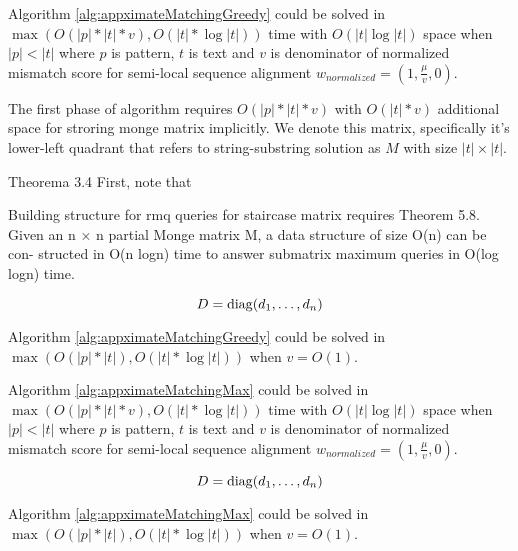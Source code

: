 \begin{theorem}
Algorithm \ref{alg:appximateMatchingGreedy} could  be solved in 
$\max ( O(|p| * |t| * v), O(|t| * \log |t|))$ time with $ O(|t| \log |t|)$ space when $|p|<|t|$ where $p$ is pattern, $t$ is text and $v$ is denominator of normalized mismatch score for semi-local sequence alignment
$w_{normalized} = (1,\frac{\mu}{v},0)$.

The first phase of algorithm requires $O(|p| * |t| * v)$ with $O(|t| * v)$ additional space for stroring monge matrix implicitly.
We denote this matrix, specifically it's lower-left quadrant that refers to
string-substring solution as $M$ with size $|t| \times |t|$.


  Theorema 3.4
First, note that 

Building structure for rmq queries for staircase matrix requires 
Theorem 5.8. Given an n × n partial Monge matrix M, a data structure of size O(n) can be con-
structed in O(n logn) time to answer submatrix maximum queries in O(log logn) time.
   

\begin{displaymath}
    D = \operatorname{diag}(d_1,\dots,d_n)
  \end{displaymath}
\end{theorem}


\begin{corollary}
Algorithm \ref{alg:appximateMatchingGreedy} could  be solved in 
$\max ( O(|p| * |t|), O(|t| * \log |t|))$ when $v = O(1)$.

\end{corollary}


\begin{theorem}
Algorithm \ref{alg:appximateMatchingMax} could  be solved in 
$\max ( O(|p| * |t| * v), O(|t| * \log |t|))$ time with $ O(|t| \log |t|)$ space when $|p|<|t|$ where $p$ is pattern, $t$ is text and $v$ is denominator of normalized mismatch score for semi-local sequence alignment
$w_{normalized} = (1,\frac{\mu}{v},0)$.

\begin{displaymath}
    D = \operatorname{diag}(d_1,\dots,d_n)
  \end{displaymath}
\end{theorem}


\begin{corollary}
Algorithm \ref{alg:appximateMatchingMax} could  be solved in 
$\max ( O(|p| * |t|), O(|t| * \log |t|))$ when $v = O(1)$.
\end{corollary}

